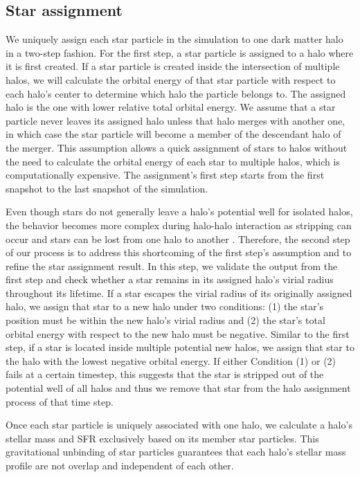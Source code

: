 \documentclass[linenumbers, twocolumn]{aastex631}
\begin{document}
\subsection{Star assignment}
\label{subsect:star_assignment}

We uniquely assign each star particle in the simulation to one dark matter halo in a two-step fashion. For the first step, a star particle is assigned to a halo where it is first created. If a star particle is created inside the intersection of multiple halos, we will calculate the orbital energy of that star particle with respect to each halo's center to determine which halo the particle belongs to. The assigned halo is the one with lower relative total orbital energy. We assume that a star particle never leaves its assigned halo unless that halo merges with another one, in which case the star particle will become a member of the descendant halo of the merger. This assumption allows a quick assignment of stars to halos without the need to calculate the orbital energy of each star to multiple halos, which is computationally expensive. The assignment's first step starts from the first snapshot to the last snapshot of the simulation. 

Even though stars do not generally leave a halo's potential well for isolated halos, the behavior becomes more complex during halo-halo interaction as stripping can occur and stars can be lost from one halo to another \citep{Kannan+2015}. Therefore, the second step of our process is to address this shortcoming of the first step's assumption and to refine the star assignment result. In this step, we validate the output from the first step and check whether a star remains in its assigned halo's virial radius throughout its lifetime. If a star escapes the virial radius of its originally assigned halo, we assign that star to a new halo under two conditions: (1) the star's position must be within the new halo's virial radius and (2) the star's total orbital energy with respect to the new halo must be negative. Similar to the first step, if a star is located inside multiple potential new halos, we assign that star to the halo with the lowest negative orbital energy. If either Condition (1) or (2) fails at a certain timestep, this suggests that the star is stripped out of the potential well of all halos and thus we remove that star from the halo assignment process of that time step. 

Once each star particle is uniquely associated with one halo, we calculate a halo's stellar mass and SFR exclusively based on its member star particles. This gravitational unbinding of star particles guarantees that each halo's stellar mass profile are not overlap and independent of each other. 
\end{document}
